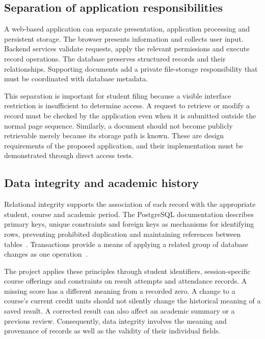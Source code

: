 \subsection{Separation of application responsibilities}\label{sec:2-3-2}

A web-based application can separate presentation, application processing and persistent storage. The browser presents information and collects user input. Backend services validate requests, apply the relevant permissions and execute record operations. The database preserves structured records and their relationships. Supporting documents add a private file-storage responsibility that must be coordinated with database metadata.

This separation is important for student filing because a visible interface restriction is insufficient to determine access. A request to retrieve or modify a record must be checked by the application even when it is submitted outside the normal page sequence. Similarly, a document should not become publicly retrievable merely because its storage path is known. These are design requirements of the proposed application, and their implementation must be demonstrated through direct access tests.

\subsection{Data integrity and academic history}\label{sec:2-3-3}

Relational integrity supports the association of each record with the appropriate student, course and academic period. The PostgreSQL documentation describes primary keys, unique constraints and foreign keys as mechanisms for identifying rows, preventing prohibited duplication and maintaining references between tables~\cite{pgconstraints}. Transactions provide a means of applying a related group of database changes as one operation~\cite{pgtransactions}.

The project applies these principles through student identifiers, session-specific course offerings and constraints on result attempts and attendance records. A missing score has a different meaning from a recorded zero. A change to a course's current credit units should not silently change the historical meaning of a saved result. A corrected result can also affect an academic summary or a previous review. Consequently, data integrity involves the meaning and provenance of records as well as the validity of their individual fields.

